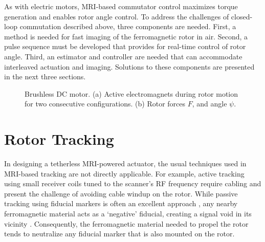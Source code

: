 \documentclass[journal]{IEEEtran}
\begin{document}
As with electric motors, MRI-based commutator control maximizes torque generation and enables rotor angle control. To address the challenges of closed-loop commutation described above, three components are needed. First, a method is needed for fast imaging of the ferromagnetic rotor in air. Second, a pulse sequence must be developed that provides for real-time control of rotor angle. Third, an estimator and controller are needed that can accommodate interleaved actuation and imaging. Solutions to these components are presented in the next three sections.

\begin{figure}[t]
\begin{center}
\end{center}
\caption{Brushless DC motor. (a) Active electromagnets during rotor motion for two consecutive configurations. (b) Rotor forces $F$, and angle $\psi$.}
\vspace{-10pt}
\end{figure}

\section{Rotor Tracking}
\label{sec:tracking}
In designing a tetherless MRI-powered actuator, the usual techniques used in MRI-based tracking are not directly applicable. For example, active tracking using small receiver coils tuned to the scanner's RF frequency \cite{qin2012prospective} require cabling and present the challenge of avoiding cable windup on the rotor. While passive tracking using fiducial markers is often an excellent approach \cite{thormer2012simultaneous}, any nearby ferromagnetic material acts as a `negative' fiducial, creating a signal void in its vicinity \cite{busse2007method}. Consequently, the ferromagnetic material needed to propel the rotor tends to neutralize any fiducial marker that is also mounted on the rotor. 
\end{document}
